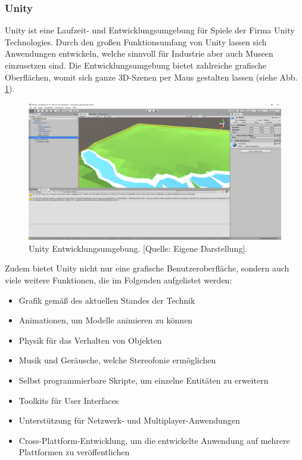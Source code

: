 \documentclass[a4paper,12pt,oneside]{article}
\begin{document}
      \subsubsection{Unity}
        Unity ist eine Laufzeit- und Entwicklungsumgebung für Spiele der Firma Unity
        Technologies. Durch den großen Funktionsumfang von Unity lassen sich
        Anwendungen entwickeln, welche sinnvoll für Industrie aber auch Museen 
        einzusetzen sind.
        Die Entwicklungsumgebung bietet zahlreiche grafische Oberflächen, womit sich ganze
        3D-Szenen per Maus gestalten lassen (siehe Abb. \ref{fig:unity1}). 
        \begin{figure}[t]
          \centering
          \includegraphics[scale=0.3]{img/unity1.png}
          \caption[Unity Entwicklungsumgebung.]{Unity Entwicklungsumgebung. [Quelle: Eigene Darstellung].}
          \label{fig:unity1}
        \end{figure}
        Zudem bietet Unity nicht nur eine grafische Benutzeroberfläche, 
        sondern auch viele weitere Funktionen, die im Folgenden aufgelistet werden: \\
        \begin{itemize}
          \item Grafik gemäß des aktuellen Standes der Technik
          \item Animationen, um Modelle animieren zu können
          \item Physik für das Verhalten von Objekten
          \item Musik und Geräusche, welche Stereofonie ermöglichen
          \item Selbst programmierbare Skripte, um einzelne Entitäten zu erweitern
          \item Toolkits für User Interfaces
          \item Unterstützung für Netzwerk- und Multiplayer-Anwendungen
          \item Cross-Plattform-Entwicklung, um die entwickelte Anwendung auf mehrere
          Plattformen zu veröffentlichen
        \end{itemize}
\end{document}

